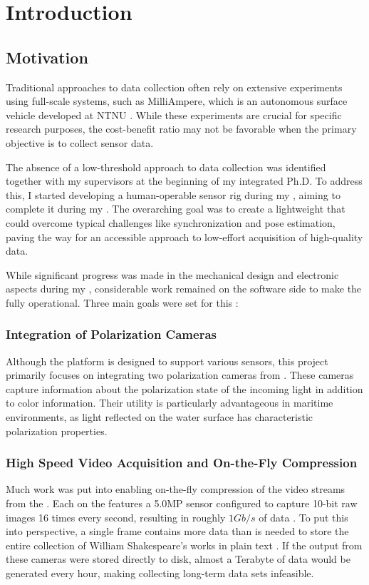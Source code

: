\chapter{Introduction}

\section{Motivation}
Traditional approaches to data collection often rely on extensive experiments using full-scale systems, such as MilliAmpere, which is an autonomous surface vehicle developed at NTNU \cite{brekkeMilliAmpereAutonomousFerry2022}.
While these experiments are crucial for specific research purposes, the cost-benefit ratio may not be favorable when the primary objective is to collect sensor data.

The absence of a low-threshold approach to data collection was identified together with my supervisors at the beginning of my integrated Ph.D.
To address this, I started developing a human-operable sensor rig during my \preproject, aiming to complete it during my \master.
The overarching goal was to create a lightweight \sr that could overcome typical challenges like synchronization and pose estimation, paving the way for an accessible approach to low-effort acquisition of high-quality data.

While significant progress was made in the mechanical design and electronic aspects during my \preproject, considerable work remained on the software side to make the \sr fully operational.
Three main goals were set for this \master:

\subsection{Integration of Polarization Cameras}
Although the \sr platform is designed to support various sensors, this \master project primarily focuses on integrating two polarization cameras from \lucid.
These cameras capture information about the polarization state of the incoming light in addition to color information.
Their utility is particularly advantageous in maritime environments, as light reflected on the water surface has characteristic polarization properties.

\subsection{High Speed Video Acquisition and On-the-Fly Compression}
\label{sec:intro:compression}
Much work was put into enabling on-the-fly compression of the video streams from the \sr.
Each \cam on the \sr features a 5.0MP sensor configured to capture 10-bit raw images 16 times every second, resulting in roughly $1Gb/s$ of data \cite{lucidvisionlabsTriton0MPPolarization}.
To put this into perspective, a single frame contains more data than is needed to store the entire collection of William Shakespeare's works in plain text \cite{projectgutenbergCompleteWorksWilliam1994}.
If the output from these cameras were stored directly to disk, almost a Terabyte of data would be generated every hour, making collecting long-term data sets infeasible.

